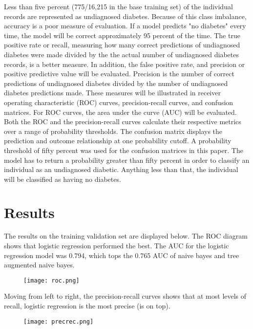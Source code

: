 \documentclass[twoside,11pt]{article}
\begin{document}
Less than five percent (775/16,215 in the base training set) of the individual records are represented as undiagnosed diabetes. Because of this class imbalance, accuracy is a poor measure of evaluation. If a model predicts "no diabetes" every time, the model will be correct approximately 95 percent of the time. The true positive rate or recall, measuring how many correct predictions of undiagnosed diabetes were made divided by the the actual number of undiagnosed diabetes records, is a better measure. In addition, the false positive rate, and precision or positive predictive value will be evaluated. Precision is the number of correct predictions of undiagnosed diabetes divided by the number of undiagnosed diabetes predictions made. These measures will be illustrated in receiver operating characteristic (ROC) curves, precision-recall curves, and confusion matrices. For ROC curves, the area under the curve (AUC) will be evaluated. Both the ROC and the precision-recall curves calculate their respective metrics over a range of probability thresholds. The confusion matrix displays the prediction and outcome relationship at one probability cutoff. A probability threshold of fifty percent was used for the confusion matrices in this paper. The model has to return a probability greater than fifty percent in order to classify an individual as an undiagnosed diabetic. Anything less than that, the individual will be classified as having no diabetes.

\section{Results} \label{results}

The results on the training validation set are displayed below. The ROC diagram shows that logistic regression performed the best. The AUC for the logistic regression model was 0.794, which tops the 0.765 AUC of naive bayes and tree augmented naive bayes.

\begin{figure}[htbp]
  \centering 
  \texttt{[image: roc.png]} 
  \label{fig:2} 
\end{figure} 

Moving from left to right, the precision-recall curves shows that at most levels of recall, logistic regression is the most precise (is on top). 

\begin{figure}[htbp]
  \centering 
  \texttt{[image: precrec.png]} 
  \label{fig:3} 
\end{figure} 
\end{document}
